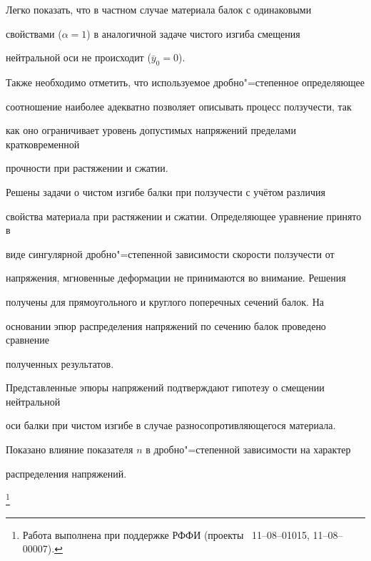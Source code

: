 Легко показать, что в частном случае материала балок с одинаковыми

свойствами ($\alpha =1$) в аналогичной задаче чистого изгиба смещения

нейтральной оси не происходит ($\bar {y}_0 =0$).



Также необходимо отметить, что используемое дробно"=степенное определяющее

соотношение наиболее адекватно позволяет описывать процесс ползучести, так

как оно ограничивает уровень допустимых напряжений пределами кратковременной

прочности при растяжении и сжатии.





\smallskip




Решены задачи о чистом изгибе балки при ползучести с учётом различия

свойства материала при растяжении и сжатии. Определяющее уравнение принято в

виде сингулярной дробно"=степенной зависимости скорости ползучести от

напряжения, мгновенные деформации не принимаются во внимание. Решения

получены для прямоугольного и круглого поперечных сечений балок. На

основании эпюр распределения напряжений по сечению балок проведено сравнение

полученных результатов.



Представленные эпюры напряжений подтверждают гипотезу о смещении нейтральной

оси балки при чистом изгибе в случае разносопротивляющегося материала.



Показано влияние показателя $n$ в дробно"=степенной зависимости на характер

распределения напряжений.



\thanks{Работа выполнена при поддержке РФФИ (проекты \No\ 11--08--01015, 11--08--00007).}



